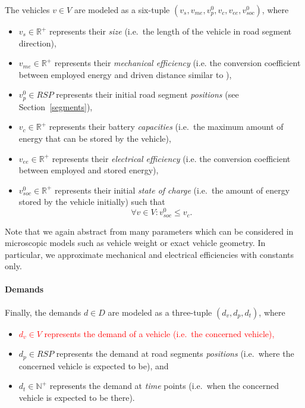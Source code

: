 The vehicles $v \in V$ are modeled as a six-tuple $(v_s, v_{me}, v_p^0, v_c, v_{ee}, v_{soc}^0)$, where
\begin{itemize}
	\item $v_s \in \mathbb{R}^+$ represents their \textit{size} (i.e.\ the length of the vehicle in road segment direction),
	\item $v_{me} \in \mathbb{R}^+$ represents their \textit{mechanical efficiency} (i.e. the conversion coefficient between employed energy and driven distance similar to \cite{gao2007modeling}),
	\item $v_p^0 \in RSP$ represents their initial road segment \textit{positions} (see Section~\ref{segments}),
	\item $v_c \in \mathbb{R}^+$ represents their battery \textit{capacities} (i.e.\ the maximum amount of energy that can be stored by the vehicle),
	\item $v_{ee} \in \mathbb{R}^+$ represents their \textit{electrical efficiency} (i.e. the conversion coefficient between employed and stored energy),
	\item $v_{soc}^0 \in \mathbb{R}^+$ represents their initial \textit{state of charge} (i.e.\ the amount of energy stored by the vehicle initially) such that
	\[
	\forall v \in V : v_{soc}^0 \leq v_c \textrm{.}
	\]
\end{itemize}
Note that we again abstract from many parameters which can be considered in microscopic models \cite{gao2007modeling} such as vehicle weight or exact vehicle geometry. In particular, we approximate mechanical and electrical efficiencies with constants only.

\paragraph{Demands}
\label{demands}

Finally, the demands $d \in D$ are modeled as a three-tuple $(d_v, d_p, d_t)$, where
\begin{itemize}
	\item \textcolor{red}{$d_v \in V$ represents the demand of a vehicle (i.e.\ the concerned vehicle),}
	\item $d_p \in RSP$ represents the demand at road segments \textit{positions} (i.e.\ where the concerned vehicle is expected to be), and
	\item $d_t \in \mathbb{N}^+$ represents the demand at \textit{time} points (i.e.\ when the concerned vehicle is expected to be there).
\end{itemize}

